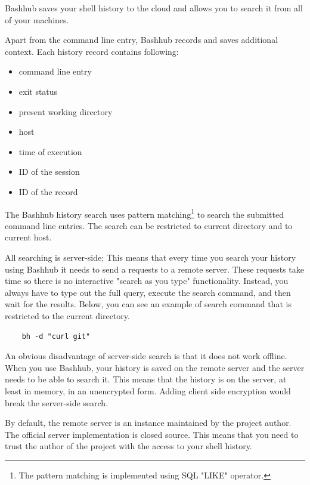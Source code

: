 Bashhub\cite{toolsbashhubclient} saves your shell history to the cloud and allows you to search it from all of your machines.

Apart from the command line entry, Bashhub records and saves additional context. Each history record contains following:
\begin{itemize}
    \item command line entry
    \item exit status
    \item present working directory
    \item host
    \item time of execution
    \item ID of the session
    \item ID of the record
\end{itemize}

The Bashhub history search uses pattern matching\footnote{The pattern matching is implemented using SQL "LIKE" operator.} to search the submitted command line entries. The search can be restricted to current directory and to current host.


All searching is server-side; This means that every time you search your history using Bashhub it needs to send a requests to a remote server.
These requests take time so there is no interactive "search as you type" functionality. Instead, you always have to type out the full query, execute the search command, and then wait%
for the results. Below, you can see an example of search command that is restricted to the current directory. 

\begin{verbatim}
    bh -d "curl git"
\end{verbatim}

An obvious disadvantage of server-side search is that it does not work offline. 
When you use Bashhub, your history is saved on the remote server and the server needs to be able to search it. This means that the history is on the server, at least in memory, in an unencrypted form. Adding client side encryption would break the server-side search.

By default, the remote server is an instance maintained by the project author. The official server implementation is closed source. This means that you need to trust the author of the project with the access to your shell history. 

